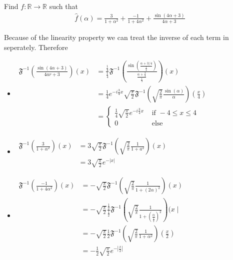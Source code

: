 \documentclass[11pt]{article}
\begin{document}
\begin{exercise}
    Find $f : \mathbb R \to \mathbb R$ such that 
    \begin{align*}
        \hat f(\alpha) = \frac{3}{1+\alpha^{2}} + \frac{-1}{1+4\alpha^{2}} + \frac{ \sin( 4 \alpha + 3 ) }{ 4 \alpha + 3 }
    \end{align*}
\end{exercise}
\begin{solution}   Because of the linearity property we can treat the inverse of each term in seperately. Therefore 
 \begin{itemize}
\item $\begin{aligned} \mathfrak{F}^{-1}\left(\frac{\sin (4 \alpha+3)}{4 a r+3}\right)(x) & =\frac{\frac{1}{4}}{\frac{1}{4}} \mathfrak{F}^{-1}\left(\frac{\sin \left(\frac{\alpha+3 / 4}{\frac{1}{4}}\right)}{\frac{\alpha+\frac{3}{4}}{\frac{1}{4}}}\right)(x) \\ & =\frac{1}{4} e^{-i \frac{3}{4} x} \sqrt{\frac{\pi}{2}} \mathfrak{F}^{-1}\left(\sqrt{\frac{2}{\pi}} \frac{\sin (\alpha)}{\alpha}\right)\left(\frac{x}{4}\right) \\ & = \begin{cases}\frac{1}{4} \sqrt{\frac{\pi}{2}} e^{-i \frac{3}{4} x} & \text { if }-4 \leq x \leq 4 \\ 0 & \text { else }\end{cases} \end{aligned}$
\item $\begin{aligned} \mathfrak{F}^{-1}\left(\frac{3}{1+\alpha^2}\right)(x) & =3 \sqrt{\frac{\pi}{2}} \mathfrak{F}^{-1}\left(\sqrt{\frac{2}{\pi}} \frac{1}{1+a^2}\right)(x) \\ & =3 \sqrt{\frac{\pi}{2}} e^{-|x|}\end{aligned}$
\item $\begin{aligned} \mathfrak{F}^{-1}\left(\frac{-1}{1+4 \alpha^2}\right)(x) & =-\sqrt{\frac{\pi}{2}} \mathfrak{F}^{-1}\left(\sqrt{\frac{2}{\pi}} \frac{1}{1+(2 \alpha)^2}\right)(x) \\ & =-\sqrt{\frac{\pi}{2}} \frac{\frac{1}{2}}{\frac{1}{2}} \mathfrak{F}^{-1}\left(\sqrt{\frac{2}{\pi}} \frac{1}{1+\left(\frac{\alpha}{\frac{1}{2}}\right)^2}\right)(x \mid \\ & =-\sqrt{\frac{\pi}{2}} \frac{1}{2} \mathfrak{F}^{-1}\left(\sqrt{\frac{2}{\pi}} \frac{1}{1+\alpha^2}\right)\left(\frac{x}{2}\right) \\ & =-\frac{1}{2} \sqrt{\frac{\pi}{2}} e^{-\left|\frac{x}{2}\right|}\end{aligned}$
\end{itemize}


\end{solution}
\end{document}
